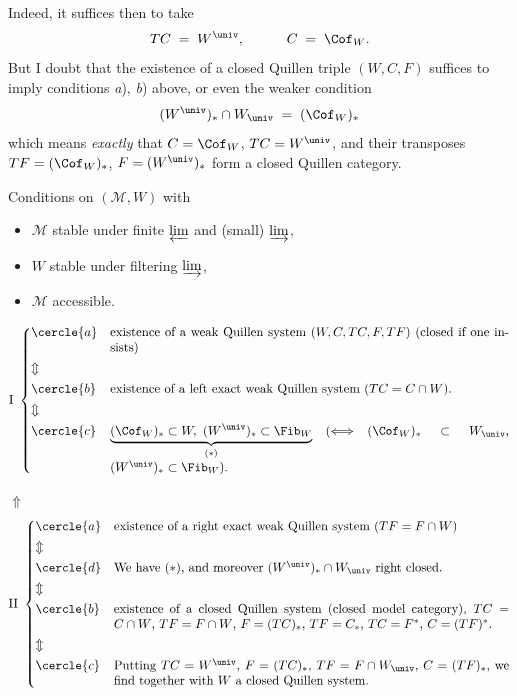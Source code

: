 \noindent Indeed, it suffices then to take
\[
TC \;=\; W^{\univ}, \qquad\quad C \;=\; \Cof_W .
\]
But I doubt that the existence of a closed Quillen triple $(W, C, F)$ suffices to imply conditions \textit{a}), \textit{b}) above, or even the weaker condition
\[
(W^{\univ})_* \cap W_{\univ} \;=\; (\Cof_W)_*
\]
which means \textit{exactly} that $C = \Cof_W$, $TC = W^{\univ}$, and their transposes $TF = (\Cof_W)_*$, $F = (W^{\univ})_*$ form a closed Quillen category.

\clearpage
{}

\noindent Conditions on $(\mathcal{M}, W)$ with
\begin{itemize}[leftmargin=3em]
\item[\textit{a})] $\mathcal{M}$ stable under finite $\varprojlim$ and (small) $\varinjlim$,
\item[\textit{b})] $W$ stable under filtering $\varinjlim$,
\item[\textit{c})] $\mathcal{M}$ accessible.
\end{itemize}

\[
\mathrm{I}\ \left\{
\begin{array}{@{}l@{\quad}p{11cm}@{}}
\cercle{a} & existence of a weak Quillen system $(W, C, TC, F, TF)$ (closed if one insists) \\[1ex]
\Updownarrow & \\[1ex]
\cercle{b} & existence of a left exact weak Quillen system ($TC = C \cap W$). \\[1ex]
\Updownarrow & \\[1ex]
\cercle{c} & $\underbrace{(\Cof_W)_* \subset W,\ (W^{\univ})_* \subset \Fib_W}_{(*)}$ ($\Longleftrightarrow$ $(\Cof_W)_* \subset W_{\univ}$, $(W^{\univ})_* \subset \Fib_W$).
\end{array}\right.
\]

\noindent$\Uparrow$
\[
\mathrm{II}\ \left\{
\begin{array}{@{}l@{\quad}p{11cm}@{}}
\cercle{a} & existence of a right exact weak Quillen system ($TF = F \cap W$) \\[1ex]
\Updownarrow & \\[1ex]
\cercle{d} & We have $(*)$, and moreover $(W^{\univ})_* \cap W_{\univ}$ right closed. \\[1ex]
\Updownarrow & \\[1ex]
\cercle{b} & existence of a closed Quillen system (closed model category), $TC = C \cap W$, $TF = F \cap W$, $F = (TC)_*$, $TF = C_*$, $TC = F^*$, $C = (TF)^*$. \\[1ex]
\Updownarrow & \\[1ex]
\cercle{c} & Putting $TC = W^{\univ}$, $F = (TC)_*$, $TF = F \cap W_{\univ}$, $C = (TF)_*$, we find together with $W$ a closed Quillen system. %
\end{array}\right.
\]

